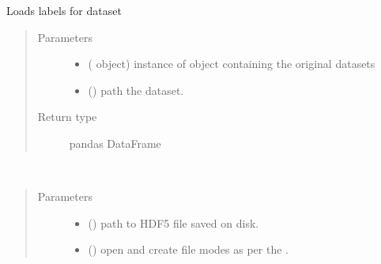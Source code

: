 \documentclass[letterpaper,10pt,english]{sphinxmanual}
\begin{document}
\begin{fulllineitems}
\begin{fulllineitems}
\label{\detokenize{data:mleap.data.data.Data.load_true_labels}}
Loads labels for dataset
\begin{quote}\begin{description}
\item[{Parameters}] \leavevmode\begin{itemize}
\item {} 
 ({\hyperref[\detokenize{shared:mleap.shared.files_io.FilesIO}]{}} object) \textendash{} instance of {\hyperref[\detokenize{shared:mleap.shared.files_io.FilesIO}]{}} object containing the original datasets

\item {} 
 () \textendash{} path the dataset.

\end{itemize}

\item[{Return type}] \leavevmode
pandas DataFrame

\end{description}\end{quote}

\end{fulllineitems}


\begin{fulllineitems}
\label{\detokenize{data:mleap.data.data.Data.open_hdf5}}~\begin{quote}\begin{description}
\item[{Parameters}] \leavevmode\begin{itemize}
\item {} 
 () \textendash{} path to HDF5 file saved on disk.

\item {} 
 () \textendash{} open and create file modes as per the .


\end{itemize}
\end{description}
\end{quote}
\end{fulllineitems}
\end{fulllineitems}
\end{document}
